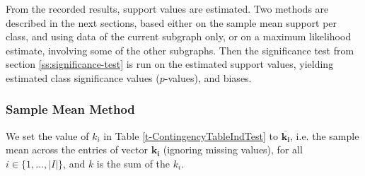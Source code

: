 \documentclass{sig-alternate}
\begin{document}
From the recorded results, support values are estimated. Two methods are described in the next sections, based either
on the sample mean support per class, and using data of the current subgraph
only, or on a maximum likelihood estimate, involving some of the other
subgraphs. Then the significance test from section \ref{ss:significance-test}
is run on the estimated support values, yielding estimated class significance values ($p$-values), 
and biases.

\subsubsection{Sample Mean Method}
\label{ss:simple-mean}
We set the value of $k_i$ in Table \ref{t-ContingencyTableIndTest} to
$\overline{\mathbf{k_i}}$, i.e. the sample mean
across the entries of vector $\mathbf{k_i}$ (ignoring missing values), for all $i \in \{1,\ldots,|I|\}$,
and $k$ is the sum of the $k_i$.
\end{document}
